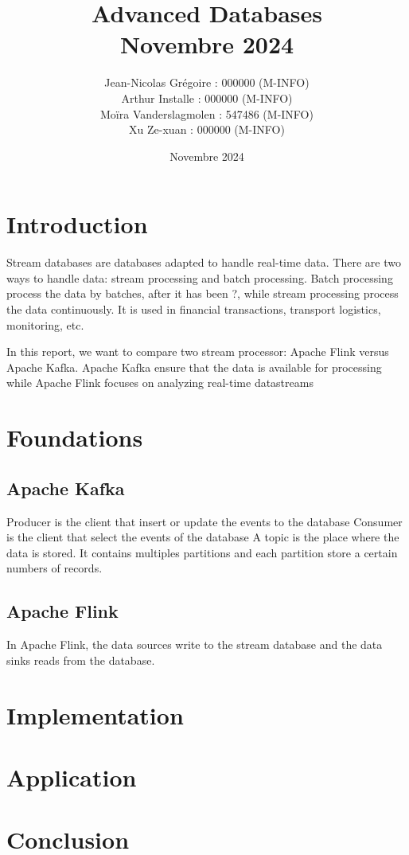 \documentclass[journal, a4paper]{IEEEtran}
\begin{document}
\title{Advanced Databases \\\vspace*{20pt} \normalsize Novembre 2024}
\author{Jean-Nicolas Grégoire : 000000 (M-INFO) \\
        Arthur Installe : 000000 (M-INFO) \\
        Moïra Vanderslagmolen : 547486 (M-INFO) \\
        Xu Ze-xuan : 000000 (M-INFO)
        }
\date{Novembre 2024}
\maketitle


\section{Introduction}

Stream databases are databases adapted to handle real-time data.
There are two ways to handle data: stream processing and batch processing.
Batch processing process the data by batches, after it has been ?, while stream processing process the data continuously.
It is used in financial transactions, transport logistics, monitoring, etc.

In this report, we want to compare two stream processor: Apache Flink versus Apache Kafka.
Apache Kafka ensure that the data is available for processing while Apache Flink focuses on analyzing real-time datastreams

\section{Foundations}

\subsection{Apache Kafka}
Producer is the client that insert or update the events to the database
Consumer is the client that select the events of the database
A topic is the place where the data is stored. It contains multiples partitions and each partition store a certain numbers of records.

\subsection{Apache Flink}

In Apache Flink, the data sources write to the stream database and the data sinks reads from the database.


\section{Implementation}

\section{Application}

\section{Conclusion}
\end{document}
